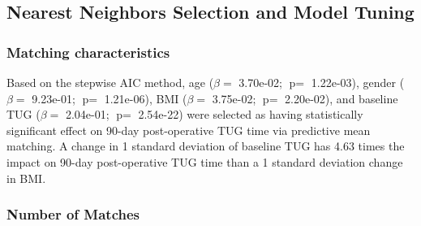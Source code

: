 \documentclass[fleqn,10pt]{wlscirep}
\begin{document}
\subsection*{Nearest Neighbors Selection and Model Tuning}




\subsubsection*{Matching characteristics}

Based on the stepwise AIC method, age ($\beta = $ 3.70e-02; $\text{p} = $ 1.22e-03), gender ($\beta = $ 9.23e-01; $\text{p} = $ 1.21e-06), BMI ($\beta = $ 3.75e-02; $\text{p} = $ 2.20e-02), and baseline TUG ($\beta = $ 2.04e-01; $\text{p} = $ 2.54e-22) were selected as having statistically significant effect on 90-day post-operative TUG time via predictive mean matching. A change in 1 standard deviation of baseline TUG has 4.63 times the impact on 90-day post-operative TUG time than a 1 standard deviation change in BMI.

\subsubsection*{Number of Matches}

\begin{knitrout}
\color{fgcolor}\begin{kframe}


{\ttfamily\noindent\bfseries{}}

{\ttfamily\noindent\bfseries{}}\end{kframe}
\end{knitrout}
\end{document}
